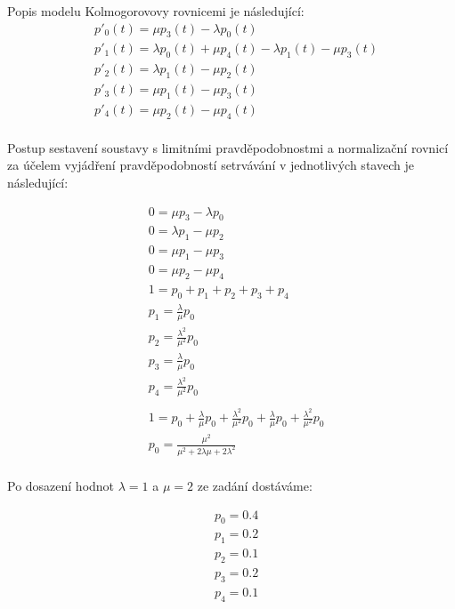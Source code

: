 \documentclass[12pt, a4paper]{article}
\begin{document}
\noindent Popis modelu Kolmogorovovy rovnicemi je následující:
\begin{equation}
    \begin{split}
    & p'_{0}(t) = \mu p_{3}(t) - \lambda p_{0}(t) \\
    & p'_{1}(t) = \lambda p_{0}(t) + \mu p_{4}(t) - \lambda p_{1}(t) - \mu p_{3}(t) \\
    & p'_{2}(t) = \lambda p_{1}(t) - \mu p_{2}(t) \\
    & p'_{3}(t) = \mu p_{1}(t) - \mu p_{3}(t) \\
    & p'_{4}(t) = \mu p_{2}(t) - \mu p_{4}(t) \\
    \end{split}
\end{equation}

Postup sestavení soustavy s limitními pravděpodobnostmi a normalizační rovnicí za účelem vyjádření pravděpodobností setrvávání v jednotlivých stavech je následující:

\begin{equation}
    \begin{split}
    & 0 = \mu p_{3} - \lambda p_{0} \\
    & 0 = \lambda p_{1} - \mu p_{2} \\
    & 0 = \mu p_{1} - \mu p_{3} \\
    & 0 = \mu p_{2} - \mu p_{4} \\
    & 1 = p_{0} + p_{1} + p_{2} + p_{3} + p_{4}
    \\
    & p_{1} = \frac{\lambda}{\mu} p_0 \\
    & p_{2} = \frac{\lambda^2}{\mu^2} p_0 \\
    & p_{3} = \frac{\lambda}{\mu} p_0 \\
    & p_{4} = \frac{\lambda^2}{\mu^2} p_0 \\
    \\
    & 1 = p_{0} + \frac{\lambda}{\mu} p_0 + \frac{\lambda^2}{\mu^2} p_0 + \frac{\lambda}{\mu} p_0 + \frac{\lambda^2}{\mu^2} p_0 \\
    & p_{0} = \frac{\mu^2}{\mu^2 + 2\lambda\mu + 2\lambda^2} \\
    \end{split}
\end{equation}

\pagebreak
\noindent Po dosazení hodnot $\lambda=1$ a $\mu=2$ ze zadání dostáváme:

\begin{equation}
    \begin{split}
    & p_{0} = 0.4 \\
    & p_{1} = 0.2 \\
    & p_{2} = 0.1 \\
    & p_{3} = 0.2 \\
    & p_{4} = 0.1 \\
    \end{split}
\end{equation}
\end{document}
